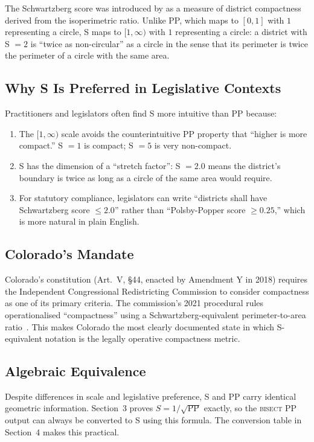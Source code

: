 The Schwartzberg score was introduced by \citet{schwartzberg1966reapportionment}
as a measure of district compactness derived from the isoperimetric ratio.
Unlike PP, which maps to $[0,1]$ with $1$ representing a circle,
S maps to $[1,\infty)$ with $1$ representing a circle:
a district with S $= 2$ is ``twice as non-circular'' as a circle
in the sense that its perimeter is twice the perimeter of a circle
with the same area.

\subsection{Why S Is Preferred in Legislative Contexts}

Practitioners and legislators often find S more intuitive than PP because:
\begin{enumerate}
  \item The $[1,\infty)$ scale avoids the counterintuitive PP property that
    ``higher is more compact.'' S $= 1$ is compact; S $= 5$ is very non-compact.
  \item S has the dimension of a ``stretch factor'': S $= 2.0$ means the district's
    boundary is twice as long as a circle of the same area would require.
  \item For statutory compliance, legislators can write ``districts shall have
    Schwartzberg score $\leq 2.0$'' rather than ``Polsby-Popper score $\geq 0.25$,''
    which is more natural in plain English.
\end{enumerate}

\subsection{Colorado's Mandate}

Colorado's constitution (Art.\ V, \S 44, enacted by Amendment Y in 2018)
requires the Independent Congressional Redistricting Commission to consider
compactness as one of its primary criteria.
The commission's 2021 procedural rules operationalised ``compactness'' using
a Schwartzberg-equivalent perimeter-to-area ratio~\citep{co_irc2021}.
This makes Colorado the most clearly documented state in which S-equivalent
notation is the legally operative compactness metric.

\subsection{Algebraic Equivalence}

Despite differences in scale and legislative preference, S and PP carry
identical geometric information.
Section~3 proves $S = 1/\sqrt{\text{PP}}$ exactly, so the \textsc{bisect}
PP output can always be converted to S using this formula.
The conversion table in Section~4 makes this practical.
